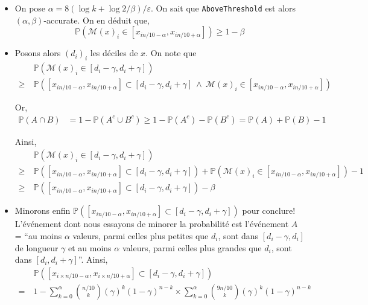 \begin{itemize}[label=•]
    \item On pose \(\alpha = 8\left( \log k + \log 2/\beta \right)/\varepsilon\). On sait que \texttt{AboveThreshold} est alors \((\alpha, \beta)\)-accurate. On en déduit que, 
    \[
        \mathbb P \left( \mathcal M(x)_i \in [x_{i n/10 -\alpha},x_{i n/10 +\alpha}] \right) \geq 1 - \beta
    \]
    \item Posons alors \((d_i)_i\) les déciles de \(x\). On note que 
    \begin{align*}
         &\ \mathbb P\left(  \mathcal M(x)_i \in [d_i - \gamma, d_i + \gamma] \right) \\
        \geq &\ \mathbb P \left([x_{i n/10 -\alpha},x_{i n/10 +\alpha}] \subset [d_i - \gamma, d_i + \gamma]\ \wedge\  \mathcal M(x)_i \in [x_{i n/10 -\alpha},x_{i n/10 +\alpha}]  \right)
    \end{align*}

    Or, 
    \begin{align*}
        \mathbb{P}(A \cap B) & = 1 - \mathbb{P}(A^c \cup B^c) \geq 1 - \mathbb{P}(A^c) -  \mathbb{P}(B^c) = \mathbb{P}(A) + \mathbb{P}(B) - 1
    \end{align*}

    Ainsi, 
    \begin{align*}
        &\  \mathbb P\left(  \mathcal M(x)_i \in [d_i - \gamma, d_i + \gamma] \right) \\
       \geq &\ \mathbb P \left([x_{i n/10 -\alpha},x_{i n/10 +\alpha}] \subset [d_i - \gamma, d_i + \gamma] \right) + \mathbb P\left( \mathcal M(x)_i \in [x_{in/10 -\alpha},x_{i n/10 +\alpha}]  \right) - 1\\
       \geq &\ \mathbb P \left([x_{i n/10 -\alpha},x_{i n/10 +\alpha}] \subset [d_i - \gamma, d_i + \gamma] \right) - \beta
   \end{align*}
   \item Minorons enfin \(\mathbb P \left([x_{i n/10 -\alpha},x_{i n/10 +\alpha}] \subset [d_i - \gamma, d_i + \gamma] \right)\) pour conclure!\\
   
    L'événement dont nous essayons de minorer la probabilité est l'événement \(A\) = ``au moins \(\alpha\) valeurs, parmi celles plus petites que \(d_i\), sont dans \([d_i - \gamma,d_i]\) de longueur \(\gamma\) et au moins \(\alpha\) valeurs, parmi celles plus grandes que \(d_i\), sont dans \([d_i, d_i + \gamma]\)''. Ainsi,
    \begin{align*}
        & \ \mathbb P \left([x_{i\times n/10 -\alpha},x_{i\times n/10 +\alpha}] \subset [d_i - \gamma, d_i + \gamma] \right)\\
        = &\ 1 - \sum_{k = 0}^{\alpha} \binom{n/10}{k}\left( \gamma \right)^k (1 - \gamma)^{n-k} \times \sum_{k = 0}^{\alpha} \binom{9n/10}{k}\left( \gamma \right)^k (1 - \gamma)^{n-k}
    \end{align*}
\end{itemize}



